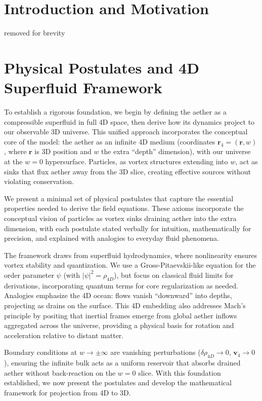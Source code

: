 \section{Introduction and Motivation}

removed for brevity

\section{Physical Postulates and 4D Superfluid Framework}

To establish a rigorous foundation, we begin by defining the aether as a compressible superfluid in full 4D space, then derive how its dynamics project to our observable 3D universe. This unified approach incorporates the conceptual core of the model: the aether as an infinite 4D medium (coordinates $\mathbf{r}_4 = (\mathbf{r}, w)$, where $\mathbf{r}$ is 3D position and $w$ the extra ``depth'' dimension), with our universe at the $w=0$ hypersurface. Particles, as vortex structures extending into $w$, act as sinks that flux aether away from the 3D slice, creating effective sources without violating conservation.

We present a minimal set of physical postulates that capture the essential properties needed to derive the field equations. These axioms incorporate the conceptual vision of particles as vortex sinks draining aether into the extra dimension, with each postulate stated verbally for intuition, mathematically for precision, and explained with analogies to everyday fluid phenomena.

The framework draws from superfluid hydrodynamics, where nonlinearity ensures vortex stability and quantization. We use a Gross-Pitaevskii-like equation for the order parameter $\psi$ (with $|\psi|^2 = \rho_{4D}$), but focus on classical fluid limits for derivations, incorporating quantum terms for core regularization as needed. Analogies emphasize the 4D ocean: flows vanish ``downward'' into depths, projecting as drains on the surface. This 4D embedding also addresses Mach's principle by positing that inertial frames emerge from global aether inflows aggregated across the universe, providing a physical basis for rotation and acceleration relative to distant matter.

Boundary conditions at $w \to \pm \infty$ are vanishing perturbations ($\delta \rho_{4D} \to 0$, $\mathbf{v}_4 \to 0$), ensuring the infinite bulk acts as a uniform reservoir that absorbs drained aether without back-reaction on the $w=0$ slice. With this foundation established, we now present the postulates and develop the mathematical framework for projection from 4D to 3D.

